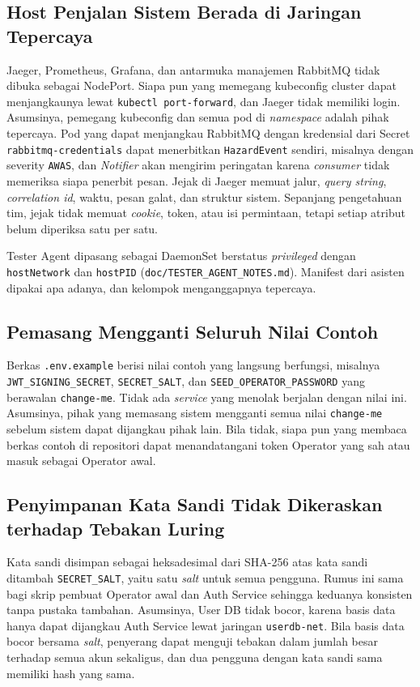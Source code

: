 \subsection{Host Penjalan Sistem Berada di Jaringan Tepercaya}

Jaeger, Prometheus, Grafana, dan antarmuka manajemen RabbitMQ tidak dibuka sebagai NodePort. Siapa pun yang memegang kubeconfig cluster dapat menjangkaunya lewat \texttt{kubectl port-forward}, dan Jaeger tidak memiliki login. Asumsinya, pemegang kubeconfig dan semua pod di \textit{namespace} adalah pihak tepercaya. Pod yang dapat menjangkau RabbitMQ dengan kredensial dari Secret \texttt{rabbitmq-credentials} dapat menerbitkan \texttt{HazardEvent} sendiri, misalnya dengan severity \texttt{AWAS}, dan \textit{Notifier} akan mengirim peringatan karena \textit{consumer} tidak memeriksa siapa penerbit pesan. Jejak di Jaeger memuat jalur, \textit{query string}, \textit{correlation id}, waktu, pesan galat, dan struktur sistem. Sepanjang pengetahuan tim, jejak tidak memuat \textit{cookie}, token, atau isi permintaan, tetapi setiap atribut belum diperiksa satu per satu.

Tester Agent dipasang sebagai DaemonSet berstatus \textit{privileged} dengan \texttt{hostNetwork} dan \texttt{hostPID} (\texttt{doc/TESTER\_AGENT\_NOTES.md}). Manifest dari asisten dipakai apa adanya, dan kelompok menganggapnya tepercaya.

\subsection{Pemasang Mengganti Seluruh Nilai Contoh}

Berkas \texttt{.env.example} berisi nilai contoh yang langsung berfungsi, misalnya \texttt{JWT\_SIGNING\_SECRET}, \texttt{SECRET\_SALT}, dan \texttt{SEED\_OPERATOR\_PASSWORD} yang berawalan \texttt{change-me}. Tidak ada \textit{service} yang menolak berjalan dengan nilai ini. Asumsinya, pihak yang memasang sistem mengganti semua nilai \texttt{change-me} sebelum sistem dapat dijangkau pihak lain. Bila tidak, siapa pun yang membaca berkas contoh di repositori dapat menandatangani token Operator yang sah atau masuk sebagai Operator awal.

\subsection{Penyimpanan Kata Sandi Tidak Dikeraskan terhadap Tebakan Luring}

Kata sandi disimpan sebagai heksadesimal dari SHA-256 atas kata sandi ditambah \texttt{SECRET\_SALT}, yaitu satu \textit{salt} untuk semua pengguna. Rumus ini sama bagi skrip pembuat Operator awal dan Auth Service sehingga keduanya konsisten tanpa pustaka tambahan. Asumsinya, User DB tidak bocor, karena basis data hanya dapat dijangkau Auth Service lewat jaringan \texttt{userdb-net}. Bila basis data bocor bersama \textit{salt}, penyerang dapat menguji tebakan dalam jumlah besar terhadap semua akun sekaligus, dan dua pengguna dengan kata sandi sama memiliki hash yang sama.

